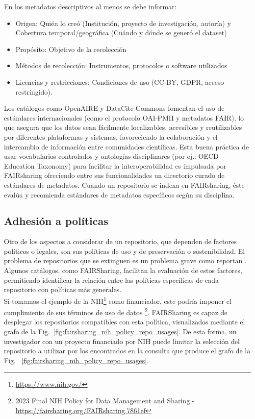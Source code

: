 \documentclass[runningheads]{llncs}
\begin{document}
En los metadatos descriptivos al menos se debe informar:  
\begin{itemize}
\item Origen: Quién lo creó (Institución, proyecto de investigación, autoría) y Cobertura temporal/geográfica (Cuándo y dónde se generó el dataset) 
\item Propósito: Objetivo de la recolección 
\item Métodos de recolección: Instrumentos, protocolos o software utilizados 
\item Licencias y restricciones: Condiciones de uso (CC-BY, GDPR, acceso restringido).
\end{itemize}

Los catálogos como OpenAIRE y DataCite Commons fomentan el uso de estándares internacionales (como el protocolo OAI-PMH y metadatos FAIR), lo que asegura que los datos sean fácilmente localizables, accesibles y reutilizables por diferentes plataformas y sistemas, favoreciendo la colaboración y el intercambio de información entre comunidades científicas. Esta buena práctica de usar vocabularios controlados
y ontologías disciplinares (por ej.:  OECD Education Taxonomy) para facilitar la interoperabilidad es impulsada por FAIRsharing  ofreciendo entre sus funcionalidades un directorio curado de estándares de metadatos. Cuando un repositorio se indexa  en FAIRsharing, éste evalúa y recomienda estándares de metadatos específicos según su disciplina. \\

\subsection*{Adhesión a políticas}
Otro de los aspectos a considerar de un repositorio, que dependen de factores políticos o legales, son sus políticas de uso y de preservación o sostenibilidad. 
El problema de repositorios que se extinguen es un problema grave como reportan \citet{strecker_disappearing_repos_23}.
Algunos catálogos, como FAIRSharing, facilitan la evaluación de estos factores, permitiendo identificar la relación entre las políticas específicas de cada repositorio con políticas más generales.\\
Si tomamos el ejemplo de la NIH\footnote{\url{https://www.nih.gov/}} como financiador, este podría imponer el cumplimiento de sus términos de uso de datos \footnote{\label{nih_policy_fairsharing} 2023 Final NIH Policy for Data Management and Sharing - \url{https://fairsharing.org/FAIRsharing.7861ef}}. FAIRSharing es capaz de desplegar los repositorios compatibles con esta política, visualizados mediante el grafo de la Fig.~\ref{fig:fairsharing_nih_policy_repo_usages}. De esta forma, un investigador con un proyecto financiado por NIH puede limitar la selección del repositorio a utilizar por los encontrados en la consulta que produce el grafo de la Fig. ~\ref{fig:fairsharing_nih_policy_repo_usages}.\\
\end{document}
